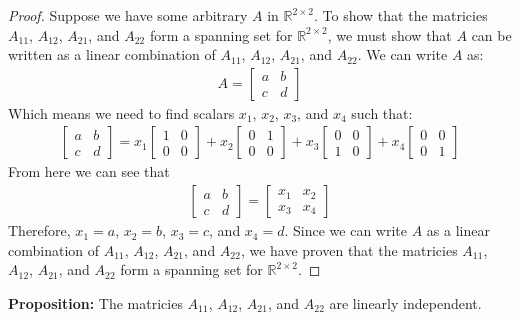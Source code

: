 \documentclass{article}
\begin{document}
\begin{proof}
Suppose we have some arbitrary $A$ in $\mathbb{R}^{2 \times 2}$.
To show that the matricies $A_{11}$, $A_{12}$, $A_{21}$, and $A_{22}$ form a spanning set for $\mathbb{R}^{2 \times 2}$, 
we must show that $A$ can be written as a linear combination of $A_{11}$, $A_{12}$, $A_{21}$, and $A_{22}$.
We can write $A$ as:
\begin{align*}
A = \begin{bmatrix} a & b \\ c & d \end{bmatrix}
\end{align*}
Which means we need to find scalars $x_{1}$, $x_{2}$, $x_{3}$, and $x_{4}$ such that:
\begin{align*}
\begin{bmatrix} a & b \\ c & d \end{bmatrix} = 
x_{1}\begin{bmatrix} 1 & 0 \\ 0 & 0 \end{bmatrix} + 
x_{2}\begin{bmatrix} 0 & 1 \\ 0 & 0 \end{bmatrix} + 
x_{3}\begin{bmatrix} 0 & 0 \\ 1 & 0 \end{bmatrix} + 
x_{4}\begin{bmatrix} 0 & 0 \\ 0 & 1 \end{bmatrix}
\end{align*}
From here we can see that
\begin{align*}
\begin{bmatrix} a & b \\ c & d \end{bmatrix} = \begin{bmatrix} x_{1} & x_{2} \\ x_{3} & x_{4} \end{bmatrix}
\end{align*}
Therefore, $x_{1} = a$, $x_{2} = b$, $x_{3} = c$, and $x_{4} = d$.
Since we can write $A$ as a linear combination of $A_{11}$, $A_{12}$, $A_{21}$, and $A_{22}$, 
we have proven that the matricies $A_{11}$, $A_{12}$, $A_{21}$, and $A_{22}$ form a spanning set for $\mathbb{R}^{2 \times 2}$.
\end{proof}

\noindent
\textbf{Proposition:} The matricies $A_{11}$, $A_{12}$, $A_{21}$, and $A_{22}$ are linearly independent.
\end{document}
